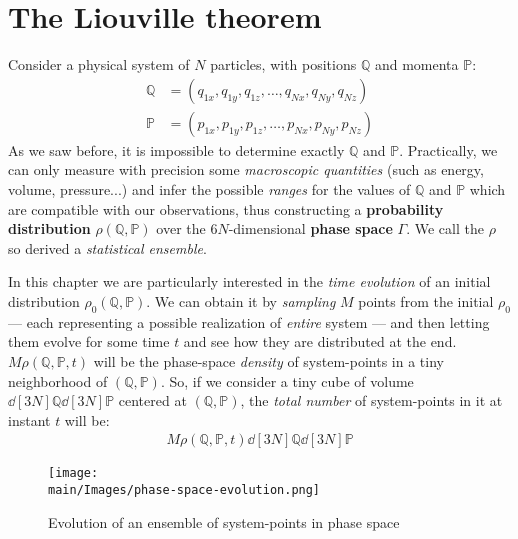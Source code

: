 \documentclass[../../main.tex]{subfiles}
\begin{document}
\section{The Liouville theorem}
Consider a physical system of $N$ particles, with positions $\mathbb{Q}$ and momenta $\mathbb{P}$:
\begin{align*}
    \mathbb{Q} &= (q_{1x}, q_{1y}, q_{1z}, \dots, q_{Nx}, q_{Ny}, q_{Nz})\\
    \mathbb{P} &= (p_{1x}, p_{1y}, p_{1z}, \dots, p_{Nx}, p_{Ny}, p_{Nz})
\end{align*} 
As we saw before, it is impossible to determine exactly $\mathbb{Q}$ and $\mathbb{P}$. Practically, we can only measure with precision some \textit{macroscopic quantities} (such as energy, volume, pressure...) and infer the possible \textit{ranges} for the values of $\mathbb{Q}$ and $\mathbb{P}$ which are compatible with our observations, thus constructing a \textbf{probability distribution} $\rho(\mathbb{Q},\mathbb{P})$ over the $6N$-dimensional \textbf{phase space} $\Gamma$. We call the $\rho$ so derived a \textit{statistical ensemble}. 

\medskip

In this chapter we are particularly interested in the \textit{time evolution} of an initial distribution $\rho_0(\mathbb{Q},\mathbb{P})$. 
We can obtain it by \textit{sampling} $M$ points from the initial $\rho_0$ --- each representing a possible realization of \textit{entire} system
--- and then letting them evolve for some time $t$ and see how they are distributed at the end. $M \rho(\mathbb{Q},\mathbb{P},t)$ will be the phase-space \textit{density} of system-points in a tiny neighborhood of $(\mathbb{Q},\mathbb{P})$. So, if we consider a tiny cube of volume $\dd[3N]{\mathbb{Q}} \dd[3N]{\mathbb{P}}$ centered at $(\mathbb{Q},\mathbb{P})$, the \textit{total number} of system-points in it at instant $t$ will be:
\begin{align*}
    M \rho(\mathbb{Q},\mathbb{P},t) \dd[3N]{\mathbb{Q}} \dd[3N]{\mathbb{P}}
\end{align*} 

\begin{figure}[H]
    \centering
    \texttt{[image: \\main/Images/phase-space-evolution.png]}
    \caption{Evolution of an ensemble of system-points in phase space}
    \label{fig:ensemble-evolution}
\end{figure}
\end{document}
